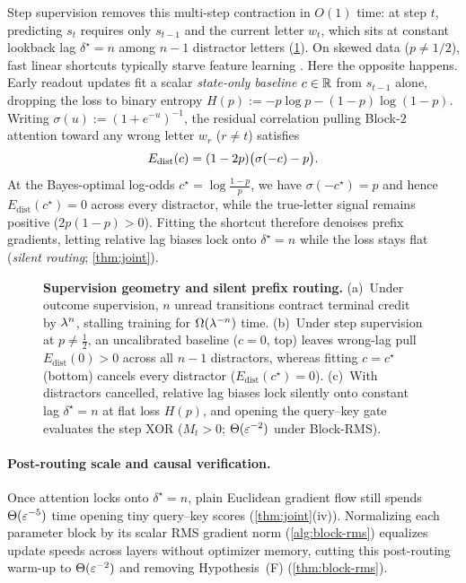 Step supervision removes this multi-step contraction in $O(1)$ time: at step $t$, predicting $s_t$ requires only $s_{t-1}$ and the current letter $w_t$, which sits at constant lookback lag $\delta^\star = n$ among $n - 1$ distractor letters (\cref{fig:gate-head}). On skewed data ($p \ne 1/2$), fast linear shortcuts typically starve feature learning \citep{labonte2026shortcut,glasgow2024sgd}. Here the opposite happens. Early readout updates fit a scalar \emph{state-only baseline} $c \in \mathbb R$ from $s_{t-1}$ alone, dropping the loss to binary entropy $H(p) := -p\log p - (1-p)\log(1-p)$. Writing $\sigma(u) := (1 + e^{-u})^{-1}$, the residual correlation pulling Block-$2$ attention toward any wrong letter $w_r$ ($r \ne t$) satisfies
\begin{equation}
  E_{\mathrm{dist}}(c) = (1-2p)\bigl(\sigma(-c) - p\bigr).
  \label{eq:Edist-intro}
\end{equation}
At the Bayes-optimal log-odds $c^\star = \log\frac{1-p}{p}$, we have $\sigma(-c^\star) = p$ and hence $E_{\mathrm{dist}}(c^\star) = 0$ across every distractor, while the true-letter signal remains positive ($2p(1-p) > 0$). Fitting the shortcut therefore denoises prefix gradients, letting relative lag biases lock onto $\delta^\star = n$ while the loss stays flat (\emph{silent routing}; \cref{thm:joint}).

\begin{figure}[t]
\centering
\fitwidth{}
\caption{\textbf{Supervision geometry and silent prefix routing.} (a)~Under outcome supervision, $n$ unread transitions contract terminal credit by $\lambda^n$, stalling training for $\Omega(\lambda^{-n})$ time. (b)~Under step supervision at $p \ne \frac{1}{2}$, an uncalibrated baseline ($c=0$, top) leaves wrong-lag pull $E_{\mathrm{dist}}(0) > 0$ across all $n-1$ distractors, whereas fitting $c = c^\star$ (bottom) cancels every distractor ($E_{\mathrm{dist}}(c^\star) = 0$). (c)~With distractors cancelled, relative lag biases lock silently onto constant lag $\delta^\star = n$ at flat loss $H(p)$, and opening the query--key gate evaluates the step XOR ($M_t > 0$; $\Theta(\varepsilon^{-2})$ under Block-RMS).}
\label{fig:gate-head}
\end{figure}

\paragraph{Post-routing scale and causal verification.}
Once attention locks onto $\delta^\star = n$, plain Euclidean gradient flow still spends $\Theta(\varepsilon^{-5})$ time opening tiny query--key scores (\cref{thm:joint}(iv)). Normalizing each parameter block by its scalar RMS gradient norm (\cref{alg:block-rms}) equalizes update speeds across layers without optimizer memory, cutting this post-routing warm-up to $\Theta(\varepsilon^{-2})$ and removing Hypothesis~(F) (\cref{thm:block-rms}).


